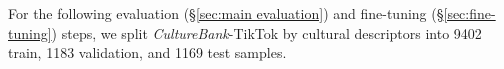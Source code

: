 \documentclass{article} %
\newcommand{\wyshi}[1]{\textcolor{red}{[#1 --Weiyan]}}
\newcommand{\ryan}[1]{\textcolor{magenta}{[#1 --Ryan]}}
\newcommand{\yutong}[1]{\textcolor{orange}{[#1 --Yutong]}}
\newcommand{\dataname}{\textit{CultureBank}\xspace}
\begin{document}
For the following evaluation (\S\ref{sec:main evaluation}) and fine-tuning (\S\ref{sec:fine-tuning}) steps, we split \dataname-TikTok by cultural descriptors into 9402 train, 1183 validation, and 1169 test samples.




 



\end{document}

